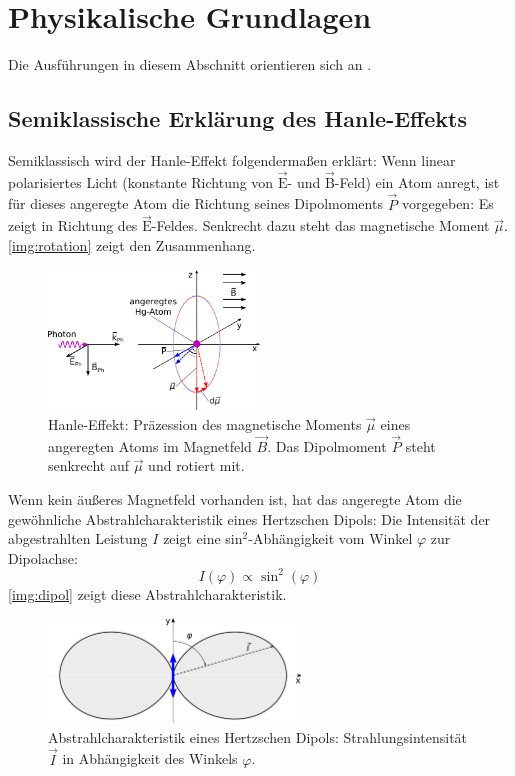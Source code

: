 \section{Physikalische Grundlagen}
Die Ausführungen in diesem Abschnitt orientieren sich an \cite{manual}.

\subsection{Semiklassische Erklärung des Hanle-Effekts}

Semiklassisch wird der Hanle-Effekt folgendermaßen erklärt:
Wenn linear polarisiertes Licht (konstante Richtung von $\vec{\text{E}}$- und $\vec{\text{B}}$-Feld)
ein Atom anregt, ist für dieses angeregte Atom die Richtung seines Dipolmoments $\vec{P}$ vorgegeben:
Es zeigt in Richtung des $\vec{\text{E}}$-Feldes. Senkrecht dazu steht das magnetische Moment $\vec{\mu}$.
\autoref{img:rotation} zeigt den Zusammenhang.

\begin{figure}[H]
\begin{center}
  \includegraphics[width=0.5\textwidth]{../img/rotation.pdf}
  \caption{Hanle-Effekt: Präzession des magnetische Moments $\vec{\mu}$ eines angeregten Atoms im
  Magnetfeld $\vec{B}$. Das Dipolmoment $\vec{P}$ steht senkrecht auf $\vec{\mu}$ und rotiert mit.}
  \label{img:rotation}
\end{center}
\end{figure}

Wenn kein äußeres Magnetfeld vorhanden ist,
hat das angeregte Atom die gewöhnliche Abstrahlcharakteristik eines Hertzschen Dipols:
Die Intensität der abgestrahlten Leistung $I$ zeigt eine sin$^2$-Abhängigkeit vom Winkel $\varphi$ zur
Dipolachse:
\begin{equation}
\label{eq:hertz}
I(\varphi) \propto \sin^2(\varphi)
\end{equation} 
\autoref{img:dipol} zeigt diese Abstrahlcharakteristik.

\begin{figure}[H]
\begin{center}
  \includegraphics[width=0.6\textwidth]{../img/dipol.pdf}
  \caption{Abstrahlcharakteristik eines Hertzschen Dipols: Strahlungsintensität $\vec{I}$ in Abhängigkeit des
  Winkels $\varphi$.}
  \label{img:dipol}
\end{center}
\end{figure}

